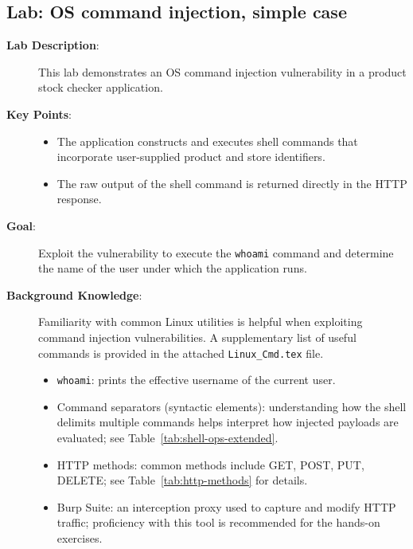 \documentclass{article}
\begin{document}
\subsection*{Lab: OS command injection, simple case}
\begin{description}
  \item[\textbf{Lab Description}:] This lab demonstrates an OS command injection vulnerability in a product stock checker application.
  \item[\textbf{Key Points}:]\leavevmode\par
    \begin{itemize}
      \item The application constructs and executes shell commands that incorporate user-supplied product and store identifiers.
      \item The raw output of the shell command is returned directly in the HTTP response.
    \end{itemize}
  \item[\textbf{Goal}:] Exploit the vulnerability to execute the \texttt{whoami} command and determine the name of the user under which the application runs.
  \item[\textbf{Background Knowledge}:]\leavevmode\par
    Familiarity with common Linux utilities is helpful when exploiting command injection vulnerabilities. A supplementary list of useful commands is provided in the attached \texttt{Linux\_Cmd.tex} file.
    \begin{itemize}
      \item \texttt{whoami}: prints the effective username of the current user.
      \item Command separators (syntactic elements): understanding how the shell delimits multiple commands helps interpret how injected payloads are evaluated; see Table~\ref{tab:shell-ops-extended}.
      \item HTTP methods: common methods include GET, POST, PUT, DELETE; see Table~\ref{tab:http-methods} for details.
      \item Burp Suite: an interception proxy used to capture and modify HTTP traffic; proficiency with this tool is recommended for the hands-on exercises.
    \end{itemize}

      \begin{center}
        \label{tab:shell-ops-extended}
        \vspace{0.5em}


\end{center}
\end{description}
\end{document}
